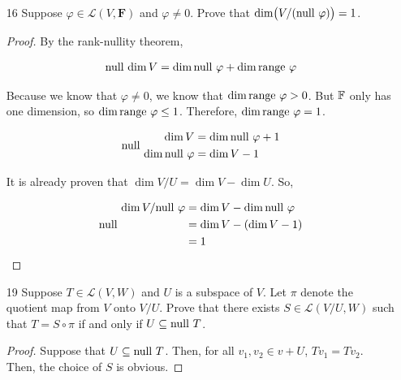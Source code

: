\begin{enumerate}
    \begin{proof}
        Consider each element of $V/U$, and arbitrarily choose some vector inside the translate to be the ``starter'' vector, $v$. Now choose an arbitrary $u$ in this translate. $v - u \in U$, so given some element of $U \times (V/U)$, we can retrieve $v$ and $v - u$. This also entirely determines the vector, and all vectors are covered, and its unique, so its an isomorphism. 
    \end{proof}

    \item[16] Suppose $\varphi \in \mathcal{L}(V, \mathbf{F})$ and $\varphi \neq 0$. Prove that
    $\dim\bigl(V/(\text{null }\varphi)\bigr) = 1$.

    \begin{proof}
        By the rank-nullity theorem, 

        \begin{align*}
            \dim V &= \dim \lnull \varphi + \dim \range \varphi \\
        \end{align*}

        Because we know that $\varphi \neq 0$, we know that $\dim \text{range } \varphi > 0$. But $\mathbb{F}$ only has one dimension, so $\dim \text{range } \varphi \leq 1$. Therefore, $\dim \text{range } \varphi = 1$.

        \begin{align*}
            \dim V &= \dim \null \varphi + 1 \\
            \dim \null \varphi &= \dim V - 1
        \end{align*}

        It is already proven that $\dim V/U = \dim V - \dim U$. So, 

        \begin{align*}
            \dim V/\null \varphi &= \dim V - \dim \null \varphi \\
            &= \dim V - (\dim V - 1) \\
            &= 1
        \end{align*}
    \end{proof}


    \item[19] Suppose $T \in \mathcal{L}(V, W)$ and $U$ is a subspace of $V$. Let $\pi$
    denote the quotient map from $V$ onto $V/U$. Prove that there exists
    $S \in \mathcal{L}(V/U, W)$ such that $T = S \circ \pi$ if and only if
    $U \subseteq \text{null } T$.

    \begin{proof}
        Suppose that $U \subseteq \text{null } T$. Then, for all $v_1, v_2 \in v + U$, $Tv_1 = Tv_2$. Then, the choice of $S$ is obvious. 


\end{proof}
\end{enumerate}
